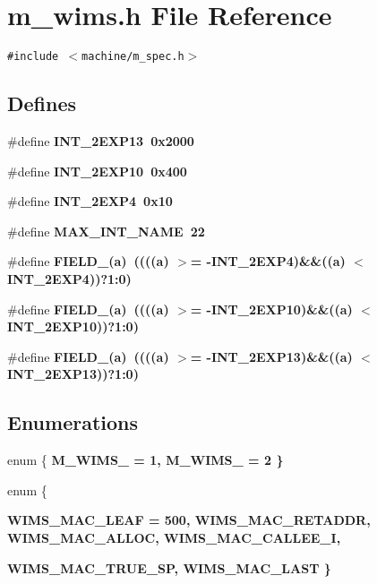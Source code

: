 \section{m\_\-wims.h File Reference}
\label{m__wims_8h}
{\tt \#include $<$machine/m\_\-spec.h$>$}\par
\subsection*{Defines}
\begin{CompactItemize}
\item 
\#define \bf{INT\_\-2EXP13}~0x2000
\item 
\#define \bf{INT\_\-2EXP10}~0x400
\item 
\#define \bf{INT\_\-2EXP4}~0x10
\item 
\#define \bf{MAX\_\-INT\_\-NAME}~22
\item 
\#define \bf{FIELD\_}(a)~((((a) $>$= -INT\_\-2EXP4)\&\&((a) $<$ INT\_\-2EXP4))?1:0)
\item 
\#define \bf{FIELD\_}(a)~((((a) $>$= -INT\_\-2EXP10)\&\&((a) $<$ INT\_\-2EXP10))?1:0)
\item 
\#define \bf{FIELD\_}(a)~((((a) $>$= -INT\_\-2EXP13)\&\&((a) $<$ INT\_\-2EXP13))?1:0)
\end{CompactItemize}
\subsection*{Enumerations}
\begin{CompactItemize}
\item 
enum \{ \bf{M\_\-WIMS\_} =  1, 
\bf{M\_\-WIMS\_} =  2
 \}
\item 
enum \{ \par
\bf{WIMS\_\-MAC\_\-LEAF} = 500, 
\bf{WIMS\_\-MAC\_\-RETADDR}, 
\bf{WIMS\_\-MAC\_\-ALLOC}, 
\bf{WIMS\_\-MAC\_\-CALLEE\_\-I}, 
\par
\bf{WIMS\_\-MAC\_\-TRUE\_\-SP}, 
\bf{WIMS\_\-MAC\_\-LAST}
 \}
\end{CompactItemize}
